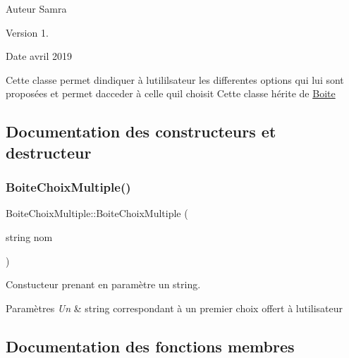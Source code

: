 \begin{DoxyAuthor}{Auteur}
Samra 
\end{DoxyAuthor}
\begin{DoxyVersion}{Version}
1. 
\end{DoxyVersion}
\begin{DoxyDate}{Date}
avril 2019
\end{DoxyDate}
Cette classe permet d\textquotesingle{}indiquer à l\textquotesingle{}utililsateur les differentes options qui lui sont proposées et permet d\textquotesingle{}acceder à celle qu\textquotesingle{}il choisit Cette classe hérite de \hyperlink{classBoite}{Boite} 

\subsection{Documentation des constructeurs et destructeur}
\mbox{\label{classBoiteChoixMultiple_a33c5d1f1b62448952ea8503cdb7ade50}} 
\subsubsection{\texorpdfstring{Boite\+Choix\+Multiple()}{BoiteChoixMultiple()}}
{\footnotesize\ttfamily Boite\+Choix\+Multiple\+::\+Boite\+Choix\+Multiple (\begin{DoxyParamCaption}\item[{string}]{nom }\end{DoxyParamCaption})}



Constucteur prenant en paramètre un string. 


\begin{DoxyParams}{Paramètres}
{\em Un} & string correspondant à un premier choix offert à l\textquotesingle{}utilisateur \\
\hline
\end{DoxyParams}


\subsection{Documentation des fonctions membres}
\mbox{\label{classBoiteChoixMultiple_aa0acac137fd87665bc4225e1eec6e387}} 
